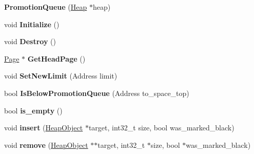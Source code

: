 \begin{DoxyCompactItemize}
\item 
{\bfseries Promotion\+Queue} (\hyperlink{classv8_1_1internal_1_1_heap}{Heap} $\ast$heap)\hypertarget{classv8_1_1internal_1_1_promotion_queue_ac9c472b9d1c50a83bc7374dd552201cf}{}\label{classv8_1_1internal_1_1_promotion_queue_ac9c472b9d1c50a83bc7374dd552201cf}

\item 
void {\bfseries Initialize} ()\hypertarget{classv8_1_1internal_1_1_promotion_queue_a6a3bd7f803954858deabd4615ce293f1}{}\label{classv8_1_1internal_1_1_promotion_queue_a6a3bd7f803954858deabd4615ce293f1}

\item 
void {\bfseries Destroy} ()\hypertarget{classv8_1_1internal_1_1_promotion_queue_af99253e51b342838cb1a489340a03f07}{}\label{classv8_1_1internal_1_1_promotion_queue_af99253e51b342838cb1a489340a03f07}

\item 
\hyperlink{classv8_1_1internal_1_1_page}{Page} $\ast$ {\bfseries Get\+Head\+Page} ()\hypertarget{classv8_1_1internal_1_1_promotion_queue_aa7ee948adff739d5dd2e2197533bb911}{}\label{classv8_1_1internal_1_1_promotion_queue_aa7ee948adff739d5dd2e2197533bb911}

\item 
void {\bfseries Set\+New\+Limit} (Address limit)\hypertarget{classv8_1_1internal_1_1_promotion_queue_ad2459b5e1377d362335de242ed9a771e}{}\label{classv8_1_1internal_1_1_promotion_queue_ad2459b5e1377d362335de242ed9a771e}

\item 
bool {\bfseries Is\+Below\+Promotion\+Queue} (Address to\+\_\+space\+\_\+top)\hypertarget{classv8_1_1internal_1_1_promotion_queue_a539894c4c56aef6f10d62317851a30a3}{}\label{classv8_1_1internal_1_1_promotion_queue_a539894c4c56aef6f10d62317851a30a3}

\item 
bool {\bfseries is\+\_\+empty} ()\hypertarget{classv8_1_1internal_1_1_promotion_queue_af4f0442551e6e3374ef388e669727a43}{}\label{classv8_1_1internal_1_1_promotion_queue_af4f0442551e6e3374ef388e669727a43}

\item 
void {\bfseries insert} (\hyperlink{classv8_1_1internal_1_1_heap_object}{Heap\+Object} $\ast$target, int32\+\_\+t size, bool was\+\_\+marked\+\_\+black)\hypertarget{classv8_1_1internal_1_1_promotion_queue_a81c3881664fa3eab1bef52ffd35a7e97}{}\label{classv8_1_1internal_1_1_promotion_queue_a81c3881664fa3eab1bef52ffd35a7e97}

\item 
void {\bfseries remove} (\hyperlink{classv8_1_1internal_1_1_heap_object}{Heap\+Object} $\ast$$\ast$target, int32\+\_\+t $\ast$size, bool $\ast$was\+\_\+marked\+\_\+black)\hypertarget{classv8_1_1internal_1_1_promotion_queue_a9ff84943cf111dafbde87ec69210c4ee}{}\label{classv8_1_1internal_1_1_promotion_queue_a9ff84943cf111dafbde87ec69210c4ee}

\end{DoxyCompactItemize}
